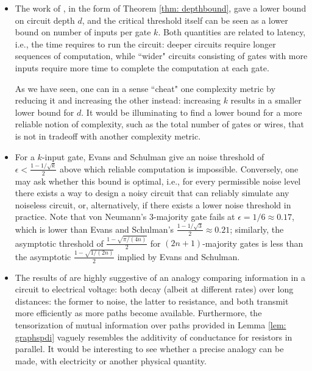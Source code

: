 \documentclass[12pt,reqno]{amsart}
\theoremstyle{plain} %
\theoremstyle{remark}
\theoremstyle{definition}
\begin{document}
\begin{itemize}
    \item The work of \cite{ES}, in the form of Theorem \ref{thm: depthbound}, gave a lower bound on circuit depth $d$, and the critical threshold itself can be seen as a lower bound on number of inputs per gate $k$. Both quantities are related to latency, i.e., the time requires to run the circuit: deeper circuits require longer sequences of computation, while ``wider" circuits consisting of gates with more inputs require more time to complete the computation at each gate.
    
    As we have seen, one can in a sense ``cheat" one complexity metric by reducing it and increasing the other instead: increasing $k$ results in a smaller lower bound for $d$. It would be illuminating to find a lower bound for a more reliable notion of complexity, such as the total number of gates or wires, that is not in tradeoff with another complexity metric.
    
    \item For a $k$-input gate, Evans and Schulman give an noise threshold of $\epsilon<\frac{1-1/\sqrt{k}}{2}$ above which reliable computation is impossible. Conversely, one may ask whether this bound is optimal, i.e., for every permissible noise level there exists a way to design a noisy circuit that can reliably simulate any noiseless circuit, or, alternatively, if there exists a lower noise threshold in practice. Note that von Neumann's $3$-majority gate fails at $\epsilon=1/6\approx 0.17$, which is lower than Evans and Schulman's $\frac{1-1/\sqrt{3}}{2}\approx 0.21$; similarly, the asymptotic threshold of $\frac{1-\sqrt{\pi/(4n)}}{2}$ for $(2n+1)$-majority gates is less than the asymptotic $\frac{1-\sqrt{1/(2n)}}{2}$ implied by Evans and Schulman.
    \item The results of \cite{ES} are highly suggestive of an analogy comparing information in a circuit to electrical voltage: both decay (albeit at different rates) over long distances: the former to noise, the latter to resistance, and both transmit more efficiently as more paths become available. Furthermore, the tensorization of mutual information over paths provided in Lemma \ref{lem: graphspdi} vaguely resembles the additivity of conductance for resistors in parallel. It would be interesting to see whether a precise analogy can be made, with electricity or another physical quantity.
\end{itemize}


\appendix
\end{document}
